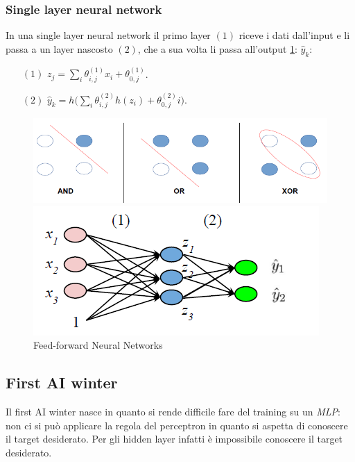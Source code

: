 		\subsubsection{Single layer neural network}
		In una single layer neural network il primo layer $(1)$ riceve i dati dall'input e li passa a un layer nascosto $(2)$, che a sua volta li passa all'output \ref{fig:chapter11-02}: $\hat{y}_k$:
		\begin{itemize}
			\item[$(1)$] $z_j = \sum\limits_i\theta^{(1)}_{i,j}x_i + \theta_{0,j}^{(1)}$.
			\item[$(2)$] $\hat{y}_k = h\bigl(\sum\limits_i\theta^{(2)}_{i,j}h(z_i)+\theta^{(2)}_{0,j}i\bigr)$.
		\end{itemize}
		\begin{figure}
			\centering
			\begin{minipage}{.5\textwidth}
				\centering
				\includegraphics[width=1\linewidth]{imgs/chapter11/img1}
				\caption{Problemi linearmente e non linearmente separabili}
				\label{fig:chapter11-01}
			\end{minipage}%
			\begin{minipage}{.5\textwidth}
				\centering
				\includegraphics[width=0.7\linewidth]{imgs/chapter11/img2}
				\caption{Feed-forward Neural Networks}
				\label{fig:chapter11-02}
			\end{minipage}
		\end{figure}


	\subsection{First AI winter}
	Il first AI winter nasce in quanto si rende difficile fare del training su un \emph{MLP}: non ci si pu\`o applicare la regola del perceptron in quanto si aspetta di conoscere il target desiderato.
	Per gli hidden layer infatti \`e impossibile conoscere il target desiderato.

